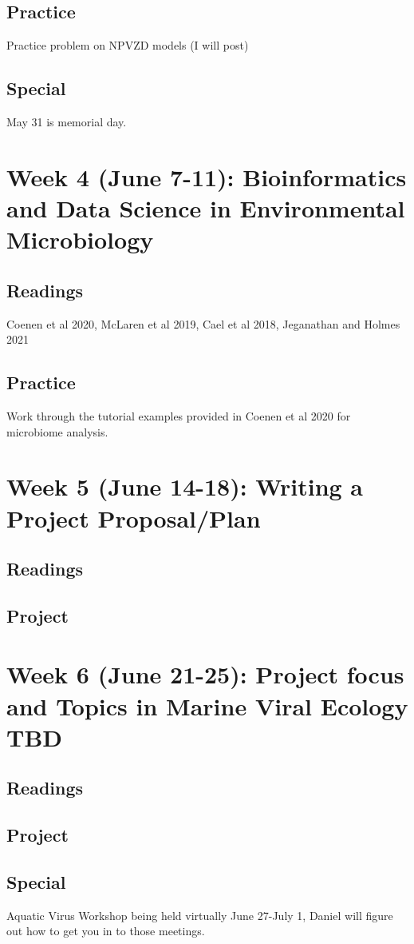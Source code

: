 \documentclass[11pt]{amsart}
\begin{document}
\subsection{Practice} Practice problem on NPVZD models (I will post)
\subsection{Special} May 31 is memorial day. 
\section{Week 4 (June 7-11): Bioinformatics and Data Science in Environmental Microbiology}
\subsection{Readings} Coenen et al 2020, McLaren et al 2019, Cael et al 2018, Jeganathan and Holmes 2021
\subsection{Practice} Work through the tutorial examples provided in Coenen et al 2020 for microbiome analysis. 
\section{Week 5 (June 14-18): Writing a Project Proposal/Plan}
\subsection{Readings}
\subsection{Project}
\section{Week 6 (June 21-25): Project focus and Topics in Marine Viral Ecology TBD}
\subsection{Readings}
\subsection{Project}
\subsection{Special} Aquatic Virus Workshop being held virtually June 27-July 1, Daniel will figure out how to get you in to those meetings. 
\end{document}
